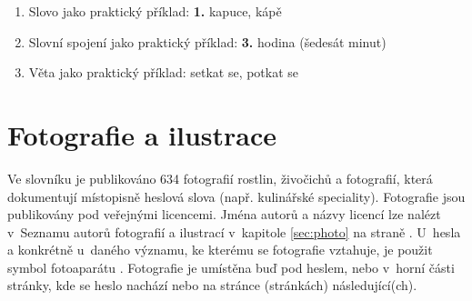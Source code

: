 \begin{enumerate}
\item Slovo jako praktický příklad:
\blspace
\dicEntry {}   \textbf{1.} {kapuce, kápě}  
\blspace
\item Slovní spojení jako praktický příklad:
\blspace
\dicEntry {}   \textbf{3.}  {hodina} {\footnotesize{(šedesát minut)}}  
\blspace
\item Věta jako praktický příklad:
\blspace
\dicEntry {}     {setkat se, potkat se}  
\end{enumerate}

\section{Fotografie a ilustrace}

Ve slovníku je publikováno 634 fotografií rostlin, živočichů a fotografií, která dokumentují místopisně heslová slova (např. kulinářské speciality).
Fotografie jsou publikovány pod veřejnými licencemi. Jména autorů a názvy licencí lze nalézt v~Seznamu autorů fotografií a ilustrací v~kapitole \ref{sec:photo} na straně \pageref{sec:photo}. U~hesla a konkrétně u~daného významu, ke kterému se fotografie vztahuje, je použit symbol fotoaparátu \dicsymPhoto. Fotografie je umístěna buď pod heslem, nebo v~horní části stránky, kde se heslo nachází nebo na stránce (stránkách) následující(ch).

